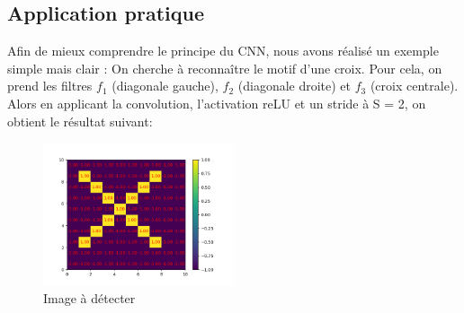 \subsection{Application pratique}

Afin de mieux comprendre le principe du CNN, nous avons réalisé un exemple simple mais clair : 
On cherche à reconnaître le motif d'une croix. 
Pour cela, on prend les filtres $f_1$ (diagonale gauche), $f_2$ (diagonale droite) et $f_3$ (croix centrale).
Alors en applicant la convolution, l'activation reLU et un stride à S = 2, on obtient le résultat suivant:

\begin{figure}[h]
    \center
    \includegraphics[width=0.5\textwidth]{img/cnn_exemple/cross/image_croix.png}
    \caption{Image à détecter}
\end{figure}

